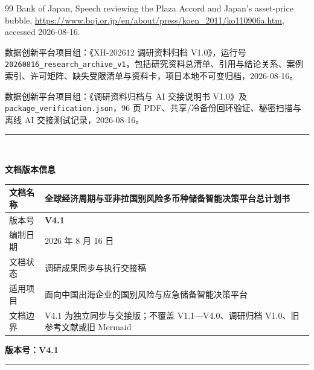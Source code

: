 \documentclass[UTF8,fontset=windows,12pt,openany]{ctexbook}
\newcommand{\Field}[1]{{\small\nolinkurl{#1}}}
\newcommand{\File}[1]{{\small\begingroup\urlstyle{same}\nolinkurl{#1}\endgroup}}
\begin{document}
\begin{thebibliography}{99}
Bank of Japan, Speech reviewing the Plaza Accord and Japan's asset-price bubble, \url{https://www.boj.or.jp/en/about/press/koen_2011/ko110906a.htm}, accessed 2026-08-16.

数据创新平台项目组：《XH-202612 调研资料归档 V1.0》，运行号 \Field{20260816_research_archive_v1}，包括研究资料总清单、引用与结论关系、案例索引、许可矩阵、缺失受限清单与资料卡，项目本地不可变归档，2026-08-16。

数据创新平台项目组：《调研资料归档与 AI 交接说明书 V1.0》及 \File{package_verification.json}，96 页 PDF、共享/冷备份回环验证、秘密扫描与离线 AI 交接测试记录，2026-08-16。

\end{thebibliography}

\clearpage
\thispagestyle{empty}
\begin{center}
  \vspace*{3.2cm}
  {\color{OceanBlue}\rule{0.82\textwidth}{1.4pt}}\\[1.2cm]
  {\Huge\bfseries\color{DeepNavy}文档版本信息\par}
  \vspace{1.4cm}
  \begin{tabular}{p{4.2cm}p{8.0cm}}
    \toprule
    文档名称 & 全球经济周期与亚非拉国别风险多币种储备智能决策平台总计划书\\
    \midrule
    版本号 & \textbf{V4.1}\\
    编制日期 & 2026 年 8 月 16 日\\
    文档状态 & 调研成果同步与执行交接稿\\
    适用项目 & 面向中国出海企业的国别风险与应急储备智能决策平台\\
    文档边界 & V4.1 为独立同步与交接版；不覆盖 V1.1—V4.0、调研归档 V1.0、旧参考文献或旧 Mermaid\\
    \bottomrule
  \end{tabular}
  \vfill
  {\Large\bfseries\color{DeepNavy}版本号：V4.1\par}
  \vspace{1.0cm}
  {\color{OceanBlue}\rule{0.82\textwidth}{1.4pt}}
\end{center}
\end{document}
